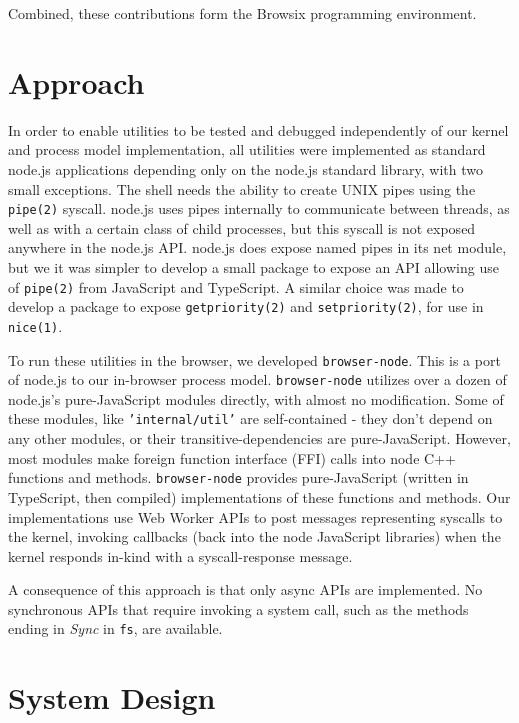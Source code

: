 \documentclass{acm_proc_article-sp}
\begin{document}
Combined, these contributions form the Browsix programming
environment.


\section{Approach}

In order to enable utilities to be tested and debugged independently
of our kernel and process model implementation, all utilities were
implemented as standard node.js applications depending only on the
node.js standard library, with two small exceptions.  The shell needs
the ability to create UNIX pipes using the \texttt{pipe(2)} syscall.
node.js uses pipes internally to communicate between threads, as well
as with a certain class of child processes, but this syscall is not
exposed anywhere in the node.js API.  node.js does expose named pipes
in its net module, but we it was simpler to develop a small package to
expose an API allowing use of \texttt{pipe(2)} from JavaScript and
TypeScript.  A similar choice was made to develop a package to expose
\texttt{getpriority(2)} and \texttt{setpriority(2)}, for use in
\texttt{nice(1)}.


To run these utilities in the browser, we developed
\texttt{browser-node}.  This is a port of node.js to our in-browser
process model.  \texttt{browser-node} utilizes over a dozen of
node.js's pure-JavaScript modules directly, with almost no
modification.  Some of these modules, like \texttt{'internal/util'}
are self-contained - they don't depend on any other modules, or their
transitive-dependencies are pure-JavaScript.  However, most modules
make foreign function interface (FFI) calls into node C++ functions
and methods.  \texttt{browser-node} provides pure-JavaScript (written
in TypeScript, then compiled) implementations of these functions and
methods.  Our implementations use Web Worker APIs to post messages
representing syscalls to the kernel, invoking callbacks (back into the
node JavaScript libraries) when the kernel responds in-kind with a
syscall-response message.

A consequence of this approach is that only async APIs are
implemented.  No synchronous APIs that require invoking a system call,
such as the methods ending in \emph{Sync} in \texttt{fs}, are
available.

\section{System Design}
\end{document}
